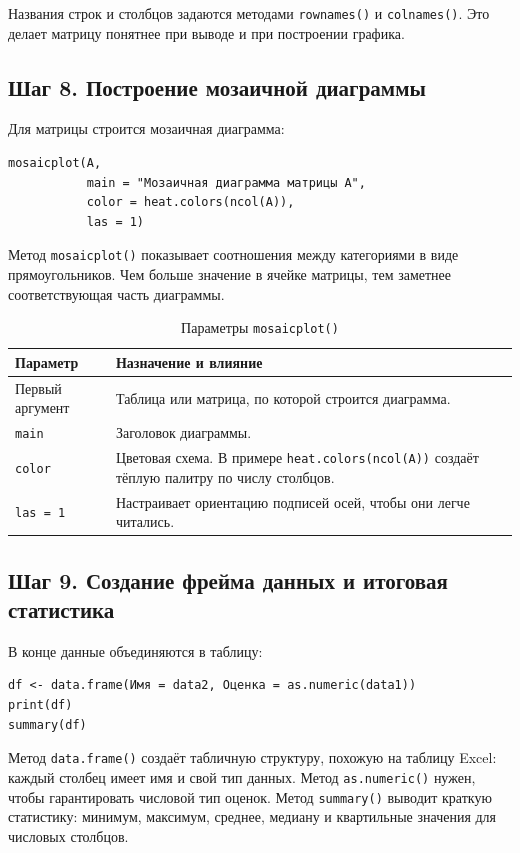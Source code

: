 \documentclass[14pt,a4paper]{extarticle}
\begin{document}
Названия строк и столбцов задаются методами \texttt{rownames()} и \texttt{colnames()}. Это делает матрицу понятнее при выводе и при построении графика.

\subsection{Шаг 8. Построение мозаичной диаграммы}

Для матрицы строится мозаичная диаграмма:

\begin{lstlisting}
mosaicplot(A,
           main = "Мозаичная диаграмма матрицы A",
           color = heat.colors(ncol(A)),
           las = 1)
\end{lstlisting}

Метод \texttt{mosaicplot()} показывает соотношения между категориями в виде прямоугольников. Чем больше значение в ячейке матрицы, тем заметнее соответствующая часть диаграммы.

\begin{table}[H]
\caption{Параметры \texttt{mosaicplot()}}
\begin{tabularx}{\textwidth}{|l|Y|}
\hline
\textbf{Параметр} & \textbf{Назначение и влияние} \\
\hline
Первый аргумент & Таблица или матрица, по которой строится диаграмма. \\
\hline
\texttt{main} & Заголовок диаграммы. \\
\hline
\texttt{color} & Цветовая схема. В примере \texttt{heat.colors(ncol(A))} создаёт тёплую палитру по числу столбцов. \\
\hline
\texttt{las = 1} & Настраивает ориентацию подписей осей, чтобы они легче читались. \\
\hline
\end{tabularx}
\end{table}

\subsection{Шаг 9. Создание фрейма данных и итоговая статистика}

В конце данные объединяются в таблицу:

\begin{lstlisting}
df <- data.frame(Имя = data2, Оценка = as.numeric(data1))
print(df)
summary(df)
\end{lstlisting}

Метод \texttt{data.frame()} создаёт табличную структуру, похожую на таблицу Excel: каждый столбец имеет имя и свой тип данных. Метод \texttt{as.numeric()} нужен, чтобы гарантировать числовой тип оценок. Метод \texttt{summary()} выводит краткую статистику: минимум, максимум, среднее, медиану и квартильные значения для числовых столбцов.
\end{document}
